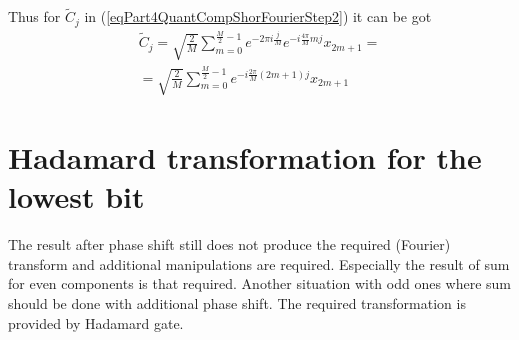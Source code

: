 \documentclass{llncs}
\begin{document}
Thus for $\tilde{C}_{j}$ in 
(\ref{eqPart4QuantCompShorFourierStep2}) it can be got
\begin{eqnarray}
\tilde{C}_{j} = 
\sqrt{\frac{2}{M}} 
\sum_{m = 0}^{\frac{M}{2} - 1} 
e^{- 2 \pi i \frac{j}{M}}
e^{-i \frac{4 \pi}{M} m j} x_{2m+1} =
\nonumber \\
=
\sqrt{\frac{2}{M}} 
\sum_{m = 0}^{\frac{M}{2} - 1} 
e^{-i \frac{2 \pi}{M} \left(2m+1\right) j} x_{2m+1}
\label{eqPart4QuantCompShorC}
\end{eqnarray}

\section{Hadamard transformation for the lowest bit}
The result after phase shift still does not produce the required
(Fourier) transform and additional manipulations are
required. Especially the result of sum for even components is that
required. Another situation with odd ones where sum should be done
with additional phase shift. The required transformation is provided
by Hadamard gate. 
\end{document}
